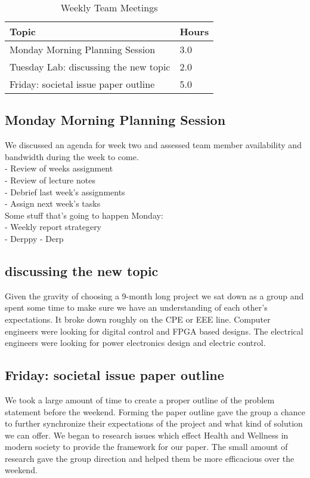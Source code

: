 \documentclass[12pt,article,compsoc]{IEEEtran}
\begin{document}
	
	\begin{table}[ht]
		\renewcommand{\arraystretch}{1.3}
			\caption{Weekly Team Meetings}
			
			\label{Team Hour Summary}
			
			\centering
			\begin{tabular}{p{7cm}|p{1cm}}
			\hline
			\bfseries 	Topic 										& \bfseries Hours\\
			\hline\hline
						Monday Morning Planning Session				& 3.0					\\
						Tuesday Lab: discussing the new topic 		& 2.0					\\	
						Friday: societal issue paper outline		& 5.0					\\	
			\hline
			\end{tabular}
		\end{table}
		 
	\subsection{Monday Morning Planning Session}
		We discussed an agenda for week two and assessed team member availability and bandwidth during the week to come. \\
		-	Review of weeks assignment				\\
		-	Review of lecture notes					\\
		-	Debrief last week’s assignments			\\
		-	Assign next week’s tasks				\\
		Some stuff that’s going to happen Monday:	\\
		-	Weekly report strategery	\\
		-	Derppy 
		-	Derp
		
	\subsection{discussing the new topic}
		Given the gravity of choosing a 9-month long project we sat down as a group and spent some time to make sure 
		we have an understanding of each other’s expectations. It broke down roughly on the CPE or EEE line. Computer 
		engineers were looking for digital control and FPGA based designs. The electrical engineers were looking for 
		power electronics design and electric control.  
		
	\subsection{Friday: societal issue paper outline}
		We took a large amount of time to create a proper outline of the problem statement before the weekend. 
		Forming the paper outline gave the group a chance to further synchronize their expectations of the project 
		and what kind of solution we can offer. We began to research issues which effect Health and Wellness in 
		modern society to provide the framework for our paper. The small amount of research gave the group direction 
		and helped them be more efficacious over the weekend. 
\end{document}
